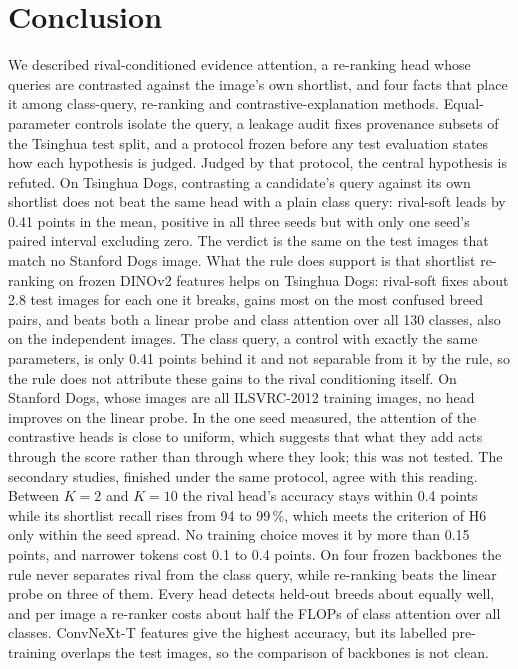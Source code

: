 \documentclass[11pt,a4paper]{article}
\theoremstyle{plain}
\begin{document}
\section{Conclusion}\label{sec:conclusion}
We described rival-conditioned evidence attention, a re-ranking head whose queries are contrasted against the
image's own shortlist, and four facts that place it among class-query, re-ranking and contrastive-explanation methods.
Equal-parameter controls isolate the query, a leakage audit fixes provenance subsets of the Tsinghua test split, and
a protocol frozen before any test evaluation states how each hypothesis is judged.
Judged by that protocol, the central hypothesis is refuted. On Tsinghua Dogs, contrasting a candidate's query
against its own shortlist does not beat the same head with a plain class query: rival-soft leads by 0.41 points in
the mean, positive in all three seeds but with only one seed's paired interval excluding zero. The verdict is the same
on the test images that match no Stanford Dogs image. What the rule does support is that shortlist re-ranking on frozen
DINOv2 features helps on Tsinghua Dogs: rival-soft fixes about 2.8 test images for each one it breaks, gains most on
the most confused breed pairs, and beats both a linear probe and class attention over all 130 classes, also on the
independent images. The class query, a control with exactly the same parameters, is only 0.41 points behind it and
not separable from it by the rule, so the rule does not attribute these gains to the rival conditioning itself. On
Stanford Dogs, whose images are all ILSVRC-2012 training images, no head improves on the linear probe. In the one seed
measured, the attention of the contrastive heads is close to uniform, which suggests that what they add acts through
the score rather than through where they look; this was not tested.
The secondary studies, finished under the same protocol, agree with this reading. Between $K=2$ and $K=10$ the rival
head's accuracy stays within 0.4 points while its shortlist recall rises from 94 to 99\,\%, which meets the criterion of
H6 only within the seed spread. No training choice moves it by more than 0.15 points, and narrower tokens cost 0.1 to
0.4 points. On four frozen backbones the rule never separates rival from the class query, while re-ranking beats the
linear probe on three of them. Every head detects held-out breeds about equally well, and per image a re-ranker costs
about half the FLOPs of class attention over all classes. ConvNeXt-T features give the highest accuracy, but its
labelled pre-training overlaps the test images, so the comparison of backbones is not clean.
\end{document}
